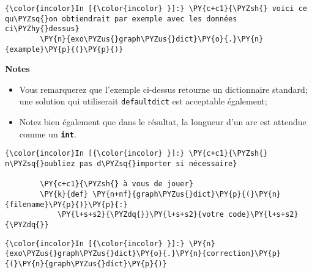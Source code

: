     \begin{Verbatim}[commandchars=\\\{\}]
{\color{incolor}In [{\color{incolor} }]:} \PY{c+c1}{\PYZsh{} voici ce qu\PYZsq{}on obtiendrait par exemple avec les données ci\PYZhy{}dessus}
        \PY{n}{exo\PYZus{}graph\PYZus{}dict}\PY{o}{.}\PY{n}{example}\PY{p}{(}\PY{p}{)}
\end{Verbatim}


    \textbf{Notes}
    
\begin{itemize}
	\item
    Vous remarquerez que l'exemple ci-dessus retourne un
	dictionnaire standard; une solution qui utiliserait \texttt{defaultdict}
	est acceptable également;
	\item
	Notez bien également que dans le résultat,
	la longueur d'un arc est attendue comme un \textbf{\texttt{int}}.
\end{itemize}

    \begin{Verbatim}[commandchars=\\\{\}]
{\color{incolor}In [{\color{incolor} }]:} \PY{c+c1}{\PYZsh{} n\PYZsq{}oubliez pas d\PYZsq{}importer si nécessaire}
        
        \PY{c+c1}{\PYZsh{} à vous de jouer}
        \PY{k}{def} \PY{n+nf}{graph\PYZus{}dict}\PY{p}{(}\PY{n}{filename}\PY{p}{)}\PY{p}{:}
            \PY{l+s+s2}{\PYZdq{}}\PY{l+s+s2}{votre code}\PY{l+s+s2}{\PYZdq{}}
\end{Verbatim}


    \begin{Verbatim}[commandchars=\\\{\}]
{\color{incolor}In [{\color{incolor} }]:} \PY{n}{exo\PYZus{}graph\PYZus{}dict}\PY{o}{.}\PY{n}{correction}\PY{p}{(}\PY{n}{graph\PYZus{}dict}\PY{p}{)}
\end{Verbatim}